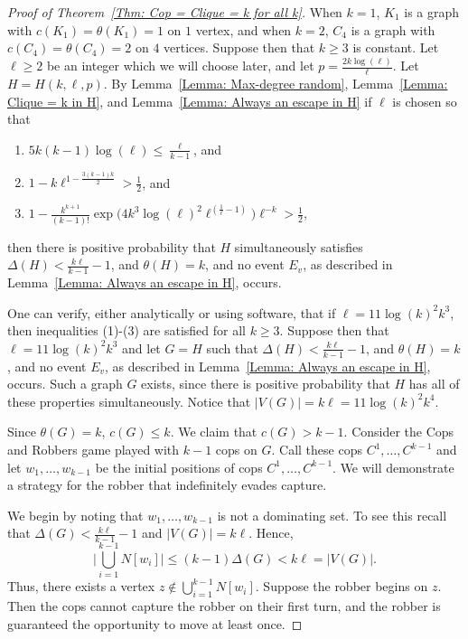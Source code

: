 \documentclass[12pt]{amsart}
\theoremstyle{definition}
\begin{document}
\begin{proof}[Proof of Theorem~\ref{Thm: Cop = Clique = k for all k}]
    When $k = 1$, $K_1$ is a graph with $c(K_1) = \theta(K_1) = 1$ on $1$ vertex, and when $k=2$, $C_4$ is a graph with $c(C_4) = \theta(C_4) = 2$ on $4$ vertices.
    Suppose then that $k\geq 3$ is constant.
    Let $\ell\geq 2$ be an integer which we will choose later, and let $p = \frac{2k\log(\ell)}{\ell}$.
    Let $H = H(k,\ell,p)$.
    By Lemma~\ref{Lemma: Max-degree random}, Lemma~\ref{Lemma: Clique = k in H}, and Lemma~\ref{Lemma: Always an escape in H} if $\ell$ is chosen so that 
    \begin{enumerate}
        \item $5k(k-1)\log(\ell) \leq \frac{\ell}{k-1}$, and
        \item $1 - k\ell^{1-\frac{3(k-1)k}{2}} > \frac{1}{2}$, and
        \item $1 - \frac{k^{k+1}}{(k-1)!}\exp\Big(4 k^{3} \log(\ell)^2 \ell^{(\frac{1}{\ell}-1)}\Big)\ell^{-k} > \frac{1}{2}$,
    \end{enumerate}
    then there is positive probability that $H$ simultaneously satisfies $\Delta(H) < \frac{k\ell}{k-1} - 1$, and $\theta(H) = k$, and no event $E_v$, as described in Lemma~\ref{Lemma: Always an escape in H}, occurs.

    One can verify, either analytically or using software, that if $\ell = 11\log(k)^2k^3$, then inequalities (1)-(3) are satisfied for all $k\geq 3$.
    Suppose then that $\ell = 11\log(k)^2k^3$ and let $G = H$ such that $\Delta(H) < \frac{k\ell}{k-1} - 1$, and $\theta(H) = k$, and no event $E_v$, as described in Lemma~\ref{Lemma: Always an escape in H}, occurs.
    Such a graph $G$ exists, since there is positive probability that $H$ has all of these properties simultaneously.
    Notice that $|V(G)| = k\ell = 11\log(k)^2k^4$.
    
    Since $\theta(G) = k$, $c(G) \leq k$.
    We claim that $c(G) > k-1$.
    Consider the Cops and Robbers game played with $k-1$ cops on $G$.
    Call these cops $C^{1}, \dots, C^{k-1}$ and 
    let $w_1, \dots, w_{k-1}$ be the initial positions of cops $C^{1}, \dots, C^{k-1}$.
    We will demonstrate a strategy for the robber that indefinitely evades capture.

    We begin by noting that $w_1, \dots, w_{k-1}$ is not a dominating set.
    To see this recall that $\Delta(G) < \frac{k\ell}{k-1} - 1$ and $|V(G)| = k\ell$.
    Hence, 
    \[
    \Big|\bigcup_{i=1}^{k-1} N[w_i]\Big| \leq (k-1)\Delta(G) < k\ell = |V(G)|.
    \]
    Thus, there exists a vertex $z \notin \bigcup_{i=1}^{k-1} N[w_i]$.
    Suppose the robber begins on $z$.
    Then the cops cannot capture the robber on their first turn, and the robber is guaranteed the opportunity to move at least once.


\end{proof}
\end{document}
